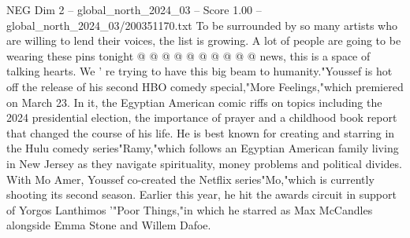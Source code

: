 \begin{textsample}{NEG Dim 2 – global\_north\_2024\_03 – Score 1.00 – global\_north\_2024\_03/200351170.txt}
To be surrounded by so many artists who are willing to lend their voices, the list is growing.
A lot of people are going to be wearing these pins tonight @ @ @ @ @ @ @ @ @ @ news, this is a space of talking hearts.
We ' re trying to have this big beam to humanity."Youssef is hot off the release of his second HBO comedy special,"More Feelings,"which premiered on March 23.
In it, the Egyptian American comic riffs on topics including the 2024 presidential election, the importance of prayer and a childhood book report that changed the course of his life.
He is best known for creating and starring in the Hulu comedy series"Ramy,"which follows an Egyptian American family living in New Jersey as they navigate spirituality, money problems and political divides.
With Mo Amer, Youssef co-created the Netflix series"Mo,"which is currently shooting its second season.
Earlier this year, he hit the awards circuit in support of Yorgos Lanthimos '"Poor Things,"in which he starred as Max McCandles alongside Emma Stone and Willem Dafoe.

\end{textsample}
